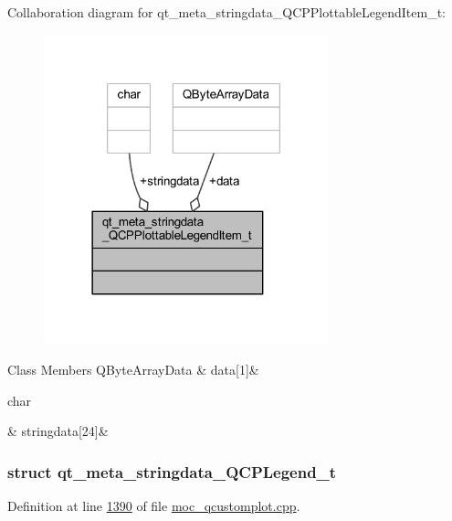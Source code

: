 Collaboration diagram for qt\+\_\+meta\+\_\+stringdata\+\_\+\+Q\+C\+P\+Plottable\+Legend\+Item\+\_\+t\+:
\nopagebreak
\begin{figure}[H]
\begin{center}
\leavevmode
\includegraphics[width=234pt]{d1/de3/a00306}
\end{center}
\end{figure}
\begin{DoxyFields}{Class Members}
\hypertarget{a00067_a56d928faacdea012d9b501b879ef98a8}{Q\+Byte\+Array\+Data}\label{a00067_a56d928faacdea012d9b501b879ef98a8}
&
data\mbox{[}1\mbox{]}&
\\
\hline

\hypertarget{a00067_a25e998eb002b6a9f9e969afa5247748f}{char}\label{a00067_a25e998eb002b6a9f9e969afa5247748f}
&
stringdata\mbox{[}24\mbox{]}&
\\
\hline

\end{DoxyFields}
\label{dc/d31/a00208}
\hypertarget{a00067_dc/d31/a00208}{}
\subsubsection{struct qt\+\_\+meta\+\_\+stringdata\+\_\+\+Q\+C\+P\+Legend\+\_\+t}


Definition at line \hyperlink{a00067_source_l01390}{1390} of file \hyperlink{a00067_source}{moc\+\_\+qcustomplot.\+cpp}.



